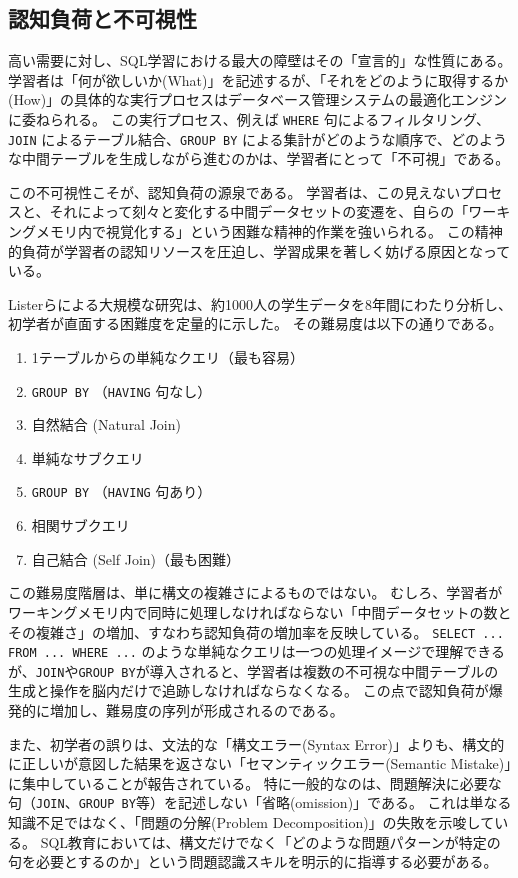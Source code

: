 \documentclass[uplatex,a4paper,12pt]{ujreport}
\begin{document}
\subsection{認知負荷と不可視性}
高い需要に対し、SQL学習における最大の障壁はその「宣言的」な性質にある。
学習者は「何が欲しいか(What)」を記述するが、「それをどのように取得するか(How)」の具体的な実行プロセスはデータベース管理システムの最適化エンジンに委ねられる。
この実行プロセス、例えば \texttt{WHERE} 句によるフィルタリング、\texttt{JOIN} によるテーブル結合、\texttt{GROUP BY} による集計がどのような順序で、どのような中間テーブルを生成しながら進むのかは、学習者にとって「不可視」である。
\par
この不可視性こそが、認知負荷の源泉である。
学習者は、この見えないプロセスと、それによって刻々と変化する中間データセットの変遷を、自らの「ワーキングメモリ内で視覚化する」という困難な精神的作業を強いられる。
この精神的負荷が学習者の認知リソースを圧迫し、学習成果を著しく妨げる原因となっている。
\par
Listerらによる大規模な研究\cite{seven-different-types-of-sql-queries}は、約1000人の学生データを8年間にわたり分析し、初学者が直面する困難度を定量的に示した。
その難易度は以下の通りである。
\begin{enumerate}
  \item 1テーブルからの単純なクエリ（最も容易）
  \item \texttt{GROUP BY} （\texttt{HAVING} 句なし）
  \item 自然結合 (Natural Join)
  \item 単純なサブクエリ
  \item \texttt{GROUP BY} （\texttt{HAVING} 句あり）
  \item 相関サブクエリ
  \item 自己結合 (Self Join)（最も困難）
\end{enumerate}
この難易度階層は、単に構文の複雑さによるものではない。
むしろ、学習者がワーキングメモリ内で同時に処理しなければならない「中間データセットの数とその複雑さ」の増加、すなわち認知負荷の増加率を反映している。
\texttt{SELECT ... FROM ... WHERE ...} のような単純なクエリは一つの処理イメージで理解できるが、\texttt{JOIN}や\texttt{GROUP BY}が導入されると、学習者は複数の不可視な中間テーブルの生成と操作を脳内だけで追跡しなければならなくなる。
この点で認知負荷が爆発的に増加し、難易度の序列が形成されるのである。
\par
また、初学者の誤りは、文法的な「構文エラー(Syntax Error)」よりも、構文的に正しいが意図した結果を返さない「セマンティックエラー(Semantic Mistake)」に集中していることが報告されている\cite{semantic-mistakes}。
特に一般的なのは、問題解決に必要な句（\texttt{JOIN}、\texttt{GROUP BY}等）を記述しない「省略(omission)」である。
これは単なる知識不足ではなく、「問題の分解(Problem Decomposition)」の失敗を示唆している。
SQL教育においては、構文だけでなく「どのような問題パターンが特定の句を必要とするのか」という問題認識スキルを明示的に指導する必要がある。
\end{document}
